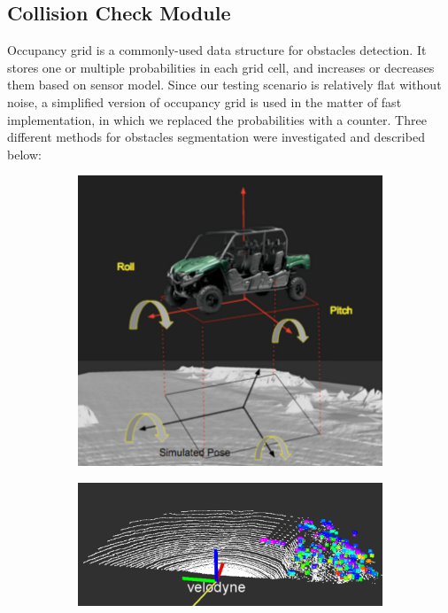 \documentclass[../thesis.tex]{subfiles}
\begin{document}
\subsection{Collision Check Module}

Occupancy grid is a commonly-used data structure for obstacles detection. It stores one or multiple probabilities in each grid cell, and increases or decreases them based on sensor model. Since our testing scenario is relatively flat without noise, a simplified version of occupancy grid is used in the matter of fast implementation, in which we replaced the probabilities with a counter. Three different methods for obstacles segmentation were investigated and described below:

\begin{figure}[t]
	\centering
	\begin{subfigure}[b]{0.3\linewidth}
		\includegraphics[width=\columnwidth]{./RRTPlanner/fig/mesh.png}
		\label{fig:collision_mesh}
	\end{subfigure}
	\begin{subfigure}[b]{0.3\linewidth}
		\includegraphics[width=\columnwidth]{./RRTPlanner/fig/ransac.png}

\end{subfigure}
\end{figure}
\end{document}
